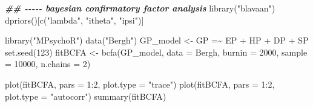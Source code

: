 \documentclass[
]{book}
\newenvironment{Shaded}{\begin{snugshade}}{\end{snugshade}}
\newcommand{\AttributeTok}[1]{\textcolor[rgb]{0.77,0.63,0.00}{#1}}
\newcommand{\DecValTok}[1]{\textcolor[rgb]{0.00,0.00,0.81}{#1}}
\newcommand{\DocumentationTok}[1]{\textcolor[rgb]{0.56,0.35,0.01}{\textbf{\textit{#1}}}}
\newcommand{\FunctionTok}[1]{\textcolor[rgb]{0.00,0.00,0.00}{#1}}
\newcommand{\NormalTok}[1]{#1}
\newcommand{\OtherTok}[1]{\textcolor[rgb]{0.56,0.35,0.01}{#1}}
\newcommand{\SpecialCharTok}[1]{\textcolor[rgb]{0.00,0.00,0.00}{#1}}
\newcommand{\StringTok}[1]{\textcolor[rgb]{0.31,0.60,0.02}{#1}}
\begin{document}
\begin{Shaded}
\begin{Highlighting}[]
\DocumentationTok{\#\# {-}{-}{-}{-}{-} bayesian confirmatory factor analysis}
\FunctionTok{library}\NormalTok{(}\StringTok{"blavaan"}\NormalTok{)}
\FunctionTok{dpriors}\NormalTok{()[}\FunctionTok{c}\NormalTok{(}\StringTok{"lambda"}\NormalTok{, }\StringTok{"itheta"}\NormalTok{, }\StringTok{"ipsi"}\NormalTok{)]}

\FunctionTok{library}\NormalTok{(}\StringTok{"MPsychoR"}\NormalTok{)}
\FunctionTok{data}\NormalTok{(}\StringTok{"Bergh"}\NormalTok{)}
\NormalTok{GP\_model }\OtherTok{\textless{}{-}} \StringTok{\textquotesingle{}GP =\textasciitilde{} EP + HP + DP + SP\textquotesingle{}}
\FunctionTok{set.seed}\NormalTok{(}\DecValTok{123}\NormalTok{)}
\NormalTok{fitBCFA }\OtherTok{\textless{}{-}} \FunctionTok{bcfa}\NormalTok{(GP\_model, }\AttributeTok{data =}\NormalTok{ Bergh, }\AttributeTok{burnin =} \DecValTok{2000}\NormalTok{, }\AttributeTok{sample =} \DecValTok{10000}\NormalTok{, }\AttributeTok{n.chains =} \DecValTok{2}\NormalTok{)}

\FunctionTok{plot}\NormalTok{(fitBCFA, }\AttributeTok{pars =} \DecValTok{1}\SpecialCharTok{:}\DecValTok{2}\NormalTok{, }\AttributeTok{plot.type =} \StringTok{"trace"}\NormalTok{)}
\FunctionTok{plot}\NormalTok{(fitBCFA, }\AttributeTok{pars =} \DecValTok{1}\SpecialCharTok{:}\DecValTok{2}\NormalTok{, }\AttributeTok{plot.type =} \StringTok{"autocorr"}\NormalTok{)}
\FunctionTok{summary}\NormalTok{(fitBCFA)}
\end{Highlighting}
\end{Shaded}


  
\end{document}
